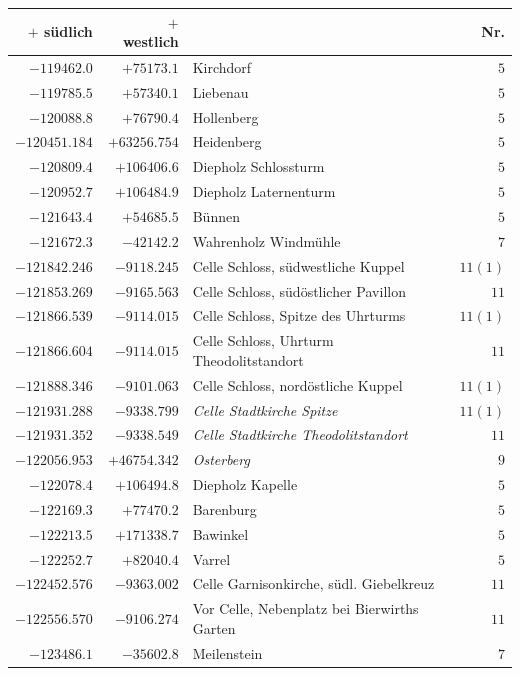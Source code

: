 \begin{center}\begingroup\fontsize{8}{9}\selectfont
\setlength{\tabcolsep}{4pt}
\begin{tabular}{r|r|p{170pt}|r}\hline
\(+\) südlich&\(+\) westlich&&Nr.\\\hline
\(-119462.0\)&\(+75173.1\)&Kirchdorf&\(5\)\\
\(-119785.5\)&\(+57340.1\)&Liebenau&\(5\)\\
\(-120088.8\)&\(+76790.4\)&Hollenberg&\(5\)\\
\(-120451.184\)&\(+63256.754\)&Heidenberg&\(5\)\\
\(-120809.4\)&\(+106406.6\)&Diepholz Schlossturm&\(5\)\\
\(-120952.7\)&\(+106484.9\)&Diepholz Laternenturm&\(5\)\\
\(-121643.4\)&\(+54685.5\)&Bünnen&\(5\)\\
\(-121672.3\)&\(-42142.2\)&Wahrenholz Windmühle&\(7\)\\
\(-121842.246\)&\(-9118.245\)&Celle Schloss, südwestliche Kuppel&\(11 (1)\)\\
\(-121853.269\)&\(-9165.563\)&Celle Schloss, südöstlicher Pavillon&\(11\)\\
\(-121866.539\)&\(-9114.015\)&Celle Schloss, Spitze des Uhrturms&\(11 (1)\)\\
\(-121866.604\)&\(-9114.015\)&Celle Schloss, Uhrturm Theodolitstandort&\(11\)\\
\(-121888.346\)&\(-9101.063\)&Celle Schloss, nordöstliche Kuppel&\(11 (1)\)\\
\(-121931.288\)&\(-9338.799\)&\textit{Celle Stadtkirche Spitze}&\(11 (1)\)\\
\(-121931.352\)&\(-9338.549\)&\textit{Celle Stadtkirche Theodolitstandort}&\(11\)\\
\(-122056.953\)&\(+46754.342\)&\textit{Osterberg}&\(9\)\\
\(-122078.4\)&\(+106494.8\)&Diepholz Kapelle&\(5\)\\
\(-122169.3\)&\(+77470.2\)&Barenburg&\(5\)\\
\(-122213.5\)&\(+171338.7\)&Bawinkel&\(5\)\\
\(-122252.7\)&\(+82040.4\)&Varrel&\(5\)\\
\(-122452.576\)&\(-9363.002\)&Celle Garnisonkirche, südl. Giebelkreuz&\(11\)\\
\(-122556.570\)&\(-9106.274\)&Vor Celle, Nebenplatz bei Bierwirths Garten&\(11\)\\
\(-123486.1\)&\(-35602.8\)&Meilenstein&\(7\)\\

\end{tabular}
\end{center}
